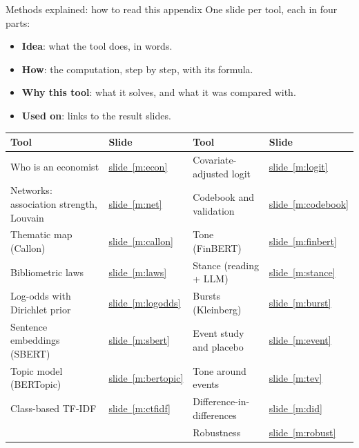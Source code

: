 \documentclass[aspectratio=169,10pt]{beamer}
\newcommand{\usedon}[1]{\hyperref[#1]{\textcolor{c4}{slide~\ref*{#1}}}}
\begin{document}
\begin{frame}{Methods explained: how to read this appendix}
\small
One slide per tool, each in four parts:
\begin{itemize}
\item \textbf{Idea}: what the tool does, in words.
\item \textbf{How}: the computation, step by step, with its formula.
\item \textbf{Why this tool}: what it solves, and what it was compared with.
\item \textbf{Used on}: links to the result slides.
\end{itemize}
\vspace{4pt}
\scriptsize
\begin{tabular}{@{}llll@{}}\toprule
\textbf{Tool} & \textbf{Slide} & \textbf{Tool} & \textbf{Slide}\\\midrule
Who is an economist & \usedon{m:econ} & Covariate-adjusted logit & \usedon{m:logit}\\
Networks: association strength, Louvain & \usedon{m:net} & Codebook and validation & \usedon{m:codebook}\\
Thematic map (Callon) & \usedon{m:callon} & Tone (FinBERT) & \usedon{m:finbert}\\
Bibliometric laws & \usedon{m:laws} & Stance (reading + LLM) & \usedon{m:stance}\\
Log-odds with Dirichlet prior & \usedon{m:logodds} & Bursts (Kleinberg) & \usedon{m:burst}\\
Sentence embeddings (SBERT) & \usedon{m:sbert} & Event study and placebo & \usedon{m:event}\\
Topic model (BERTopic) & \usedon{m:bertopic} & Tone around events & \usedon{m:tev}\\
Class-based TF-IDF & \usedon{m:ctfidf} & Difference-in-differences & \usedon{m:did}\\
 & & Robustness & \usedon{m:robust}\\
\bottomrule\end{tabular}
\end{frame}
\end{document}
